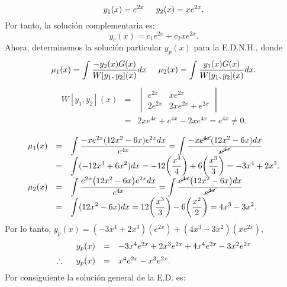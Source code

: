 \documentclass[9pt]{beamer}
\begin{document}
\begin{frame}[t]
	\begin{alertblock}{}
		\[
			y_1(x) = e^{2x} \hspace{5mm} y_2(x) = xe^{2x}.
		\]
		Por tanto, la solución complementaria es:
		\[
			y_c(x) = c_1e^{2x} + c_2xe^{2x}.
		\]
		Ahora, determinemos la solución particular \(y_p(x)\) para la E.D.N.H., donde
		\[
			\mu _1(x) = \displaystyle\int \dfrac{-y_2(x) G(x)}{W[y_1,y_2] (x)} dx \hspace{5mm} \mu _2(x) = \displaystyle\int \dfrac{y_1(x) G(x)}{W[y_1,y_2] (x)} dx.
		\]
		\[
			\begin{array}{rcl}
				W[y_1,y_2] (x) & = & \begin{vmatrix}
					e^{2x} & xe^{2x} \\
					2e^{2x} & 2xe^{{2x}} + e^{2x}
				\end{vmatrix}\\[2mm]
				& = & 2xe^{4x} +e^{4x} -2xe^{4x} = e^{4x} \ne 0.
			\end{array}
		\]
	\end{alertblock}
\end{frame}

\begin{frame}[t]
	\begin{alertblock}{}
		\[
			\begin{array}{rcl}
				\mu _1(x) & = & \displaystyle\int \dfrac{-xe^{2x} (12x^2-6x) e^{2x} dx}{e^{4x}} = \displaystyle\int \dfrac{-x \cancel{e^{4x}} (12x^2-6x) dx}{\cancel{e^{4x}}} \\[2mm]
				& = & \displaystyle\int (-12x^3+6x^2) dx = -12 \bigg(\dfrac{x^4}{4}\bigg) + 6 \bigg(\dfrac{x^3}{3}\bigg) = -3x^4+2x^3. \\[2mm]
				\mu _2(x) & = & \displaystyle\int \dfrac{e^{2x} \big(12x^2-6x\big) e^{2x} dx}{e^{4x}} = \displaystyle\int \dfrac{\cancel{e^{4x}} \big(12x^2 -6x\big) dx}{\cancel{e^{4x}}} \\[2mm]
				& = & \displaystyle\int (12x^2-6x) dx = 12 \bigg(\dfrac{x^3}{3}\bigg) - 6 \bigg(\dfrac{x^2}{2}\bigg) = 4x^3-3x^2.
			\end{array}
		\]
		Por lo tanto, \(y_p(x) = (-3x^4+2x^3) (e^{2x}) + (4x^3-3x^2) (xe^{2x})\),
		\[
			\begin{array}{rcl}
				y_p(x) & = & -3x^4e^{2x} +2x^3e^{2x} + 4x^4e^{2x} -3x^2e^{2x} \\[2mm]
				\therefore \hspace{5mm} y_p(x) & = & x^4e^{2x} -x^3e^{2x} .
			\end{array}
		\]
		Por consiguiente la solución general de la E.D. es:
	\end{alertblock}
\end{frame}
\end{document}
